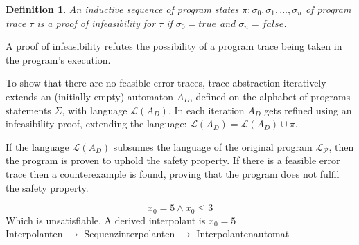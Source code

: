 \documentclass{article}
\newcounter{example}[section]
\newtheorem{mydef}{Definition}
\newcommand\mycom[1]{}
\newcommand\mycom[1]{#1}
\newcommand{\jw}[1]{\mycom{\todo[color=blue!40,inline]{\small JW: #1}}}
\newcommand{\dd}[1]{\mycom{\todo[color=orange!40,inline]{\small DD: #1}}}
\begin{document}
\begin{mydef}
    An inductive sequence  of program states $\pi: \sigma_0, \sigma_1,..., \sigma_n$ of program trace $\tau$ is a proof of infeasibility for $\tau$ if $\sigma_0 = true$ and $\sigma_n = false$.
\end{mydef}
A proof of infeasibility refutes the possibility of a program trace being taken in the program's execution.

To show that there are no feasible error traces, trace abstraction iteratively extends an (initially empty) automaton $A_D$, defined on the alphabet of programs statements $\Sigma$, with language $\mathcal{L}(A_D)$. 
In each iteration $A_D$ gets refined using an infeasibility proof, extending the language: $\mathcal{L}(A_D) = \mathcal{L}(A_D) \cup \pi$.
\dd{No, not with $\pi$. Perhaps with $\{\tau\}$. Also, write it as update $:=$.}
If the language $\mathcal{L}(A_D)$ subsumes the language of the original program $\mathcal{L_P}$, then the program is proven to uphold the safety property.
If there is a feasible error trace then a counterexample is found, proving that the program does not fulfil the safety property.

\jw{TODO}

\begin{equation}
    x_0 = 5 \land x_0 \leq 3
\end{equation}
Which is unsatisfiable. A derived interpolant is $x_0 = 5$ \\
Interpolanten $\rightarrow$ Sequenzinterpolanten \cite{10.1007/11691372_33} $\rightarrow$ Interpolantenautomat
\dd{Even if this is todo, the example is not really helpful for an interpolant. And, if you want to be complete, you could add the definition of (binary or sequence) interpolants}
\end{document}
